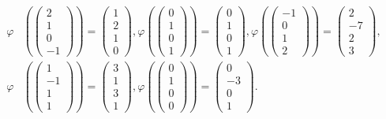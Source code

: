 \begin{align*}
	\varphi &\left(\begin{pmatrix}
		2 \\ 1 \\ 0 \\ -1
	\end{pmatrix}\right) = \begin{pmatrix}
		1 \\ 2 \\ 1 \\ 0
	\end{pmatrix}, 
	\varphi\left( \begin{pmatrix}
		0 \\ 1 \\ 0 \\ 1
	\end{pmatrix} \right) = \begin{pmatrix}
		0 \\ 1 \\ 0 \\ 1
	\end{pmatrix}, 
	\varphi\left( \begin{pmatrix}
		-1 \\ 0 \\ 1 \\ 2
	\end{pmatrix} \right) = \begin{pmatrix}
		2 \\ -7 \\ 2 \\ 3
	\end{pmatrix}, \\
	\varphi &\left( \begin{pmatrix}
		1 \\ -1 \\ 1 \\ 1
	\end{pmatrix} \right) = \begin{pmatrix}
		3 \\ 1 \\ 3 \\ 1
	\end{pmatrix}, 
	\varphi\left( \begin{pmatrix}
		0 \\ 1 \\ 0 \\ 0
	\end{pmatrix} \right) = \begin{pmatrix}
		0 \\ -3 \\ 0 \\1
	\end{pmatrix}\text{.}
\end{align*}

